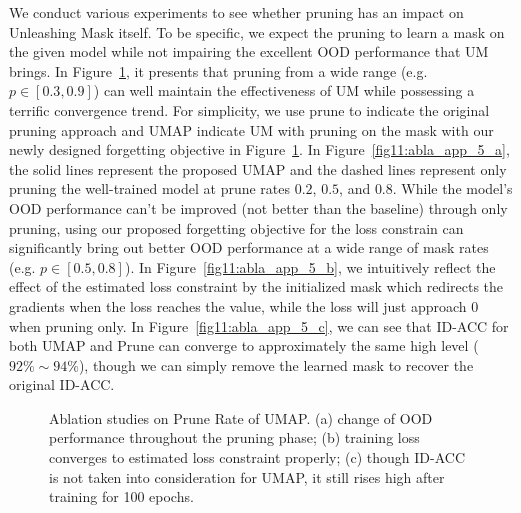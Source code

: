 \documentclass{article}
\theoremstyle{plain}
\theoremstyle{definition}
\theoremstyle{remark}
\begin{document}
We conduct various experiments to see whether pruning has an impact on Unleashing Mask itself. To be specific, we expect the pruning to learn a mask on the given model while not impairing the excellent OOD performance that UM brings. In Figure~\ref{fig11:abla_app_5}, it presents that pruning from a wide range (e.g. $p \in [0.3, 0.9]$) can well maintain the effectiveness of UM while possessing a terrific convergence trend. For simplicity, we use prune to indicate the original pruning approach and UMAP indicate UM with pruning on the mask with our newly designed forgetting objective in Figure~\ref{fig11:abla_app_5}. In Figure~\ref{fig11:abla_app_5_a}, the solid lines represent the proposed UMAP and the dashed lines represent only pruning the well-trained model at prune rates $0.2$, $0.5$, and $0.8$. While the model's OOD performance can't be improved (not better than the baseline) through only pruning, using our proposed forgetting objective for the loss constrain can significantly bring out better OOD performance at a wide range of mask rates (e.g. $p \in [0.5, 0.8]$). In Figure~\ref{fig11:abla_app_5_b}, we intuitively reflect the effect of the estimated loss constraint by the initialized mask which redirects the gradients when the loss reaches the value, while the loss will just approach $0$ when pruning only. In Figure~\ref{fig11:abla_app_5_c}, we can see that ID-ACC for both UMAP and Prune can converge to approximately the same high level ($92\%\sim 94\%$), though we can simply remove the learned mask to recover the original ID-ACC.

\begin{figure}[t!]
    \begin{center}
    \end{center}
    \caption{Ablation studies on Prune Rate of UMAP. (a) change of OOD performance throughout the pruning phase; (b) training loss converges to estimated loss constraint properly; (c) though ID-ACC is not taken into consideration for UMAP, it still rises high after training for 100 epochs.}
    \label{fig11:abla_app_5}
\end{figure}
\end{document}
